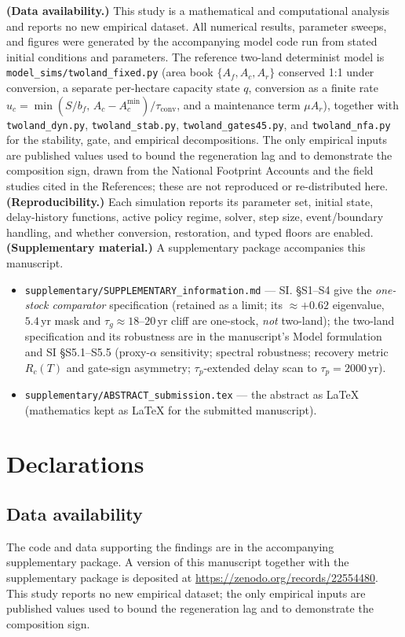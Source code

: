 \documentclass[11pt]{article}
\begin{document}
\noindent\textbf{(Data availability.)} This study is a mathematical and computational analysis and reports no new empirical dataset. All numerical results, parameter sweeps, and figures were generated by the accompanying model code run from stated initial conditions and parameters. The reference two-land determinist model is \texttt{model\_sims/twoland\_fixed.py} (area book $\{A_f,A_c,A_r\}$ conserved 1:1 under conversion, a separate per-hectare capacity state $q$, conversion as a finite rate $u_c=\min(S/b_f,\,A_c-A_c^{\min})/\tau_{\mathrm{conv}}$, and a maintenance term $\mu A_r$), together with \texttt{twoland\_dyn.py}, \texttt{twoland\_stab.py}, \texttt{twoland\_gates45.py}, and \texttt{twoland\_nfa.py} for the stability, gate, and empirical decompositions. The only empirical inputs are published values used to bound the regeneration lag and to demonstrate the composition sign, drawn from the National Footprint Accounts and the field studies cited in the References; these are not reproduced or re-distributed here. \textbf{(Reproducibility.)} Each simulation reports its parameter set, initial state, delay-history functions, active policy regime, solver, step size, event/boundary handling, and whether conversion, restoration, and typed floors are enabled. \textbf{(Supplementary material.)} A supplementary package accompanies this manuscript.

\begin{itemize}
\item \texttt{supplementary/SUPPLEMENTARY\_information.md} --- SI. \S S1--S4 give the \emph{one-stock comparator} specification (retained as a limit; its $\approx+0.62$ eigenvalue, $5.4$\,yr mask and $\tau_g\approx18$--$20$\,yr cliff are one-stock, \emph{not} two-land); the two-land specification and its robustness are in the manuscript's Model formulation and SI \S S5.1--S5.5 (proxy-$\alpha$ sensitivity; spectral robustness; recovery metric $R_c(T)$ and gate-sign asymmetry; $\tau_p$-extended delay scan to $\tau_p=2000$\,yr).
\item \texttt{supplementary/ABSTRACT\_submission.tex} --- the abstract as LaTeX (mathematics kept as LaTeX for the submitted manuscript).
\end{itemize}

\section*{Declarations}

\subsection*{Data availability}
The code and data supporting the findings are in the accompanying supplementary package. A version of this manuscript together with the supplementary package is deposited at \url{https://zenodo.org/records/22554480}. This study reports no new empirical dataset; the only empirical inputs are published values used to bound the regeneration lag and to demonstrate the composition sign.
\end{document}
